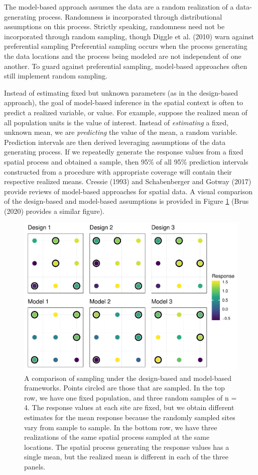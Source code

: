 \documentclass[]{elsarticle} %
\begin{document}
The model-based approach assumes the data are a random realization of a
data-generating process. Randomness is incorporated through
distributional assumptions on this process. Strictly speaking,
randomness need not be incorporated through random sampling, though
Diggle et al. (2010) warn against preferential sampling Preferential
sampling occurs when the process generating the data locations and the
process being modeled are not independent of one another. To guard
against preferential sampling, model-based approaches often still
implement random sampling.

Instead of estimating fixed but unknown parameters (as in the
design-based approach), the goal of model-based inference in the spatial
context is often to predict a realized variable, or value. For example,
suppose the realized mean of all population units is the value of
interest. Instead of \emph{estimating} a fixed, unknown mean, we are
\emph{predicting} the value of the mean, a random variable. Prediction
intervals are then derived leveraging assumptions of the data generating
process. If we repeatedly generate the response values from a fixed
spatial process and obtained a sample, then 95\% of all 95\% prediction
intervals constructed from a procedure with appropriate coverage will
contain their respective realized means. Cressie (1993) and
Schabenberger and Gotway (2017) provide reviews of model-based
approaches for spatial data. A visual comparison of the design-based and
model-based assumptions is provided in Figure \ref{fig:fig1} (Brus
(2020) provides a similar figure).

\begin{figure}
\includegraphics[width=1\linewidth]{manuscript_files/figure-latex/fig1-1} \caption{A comparison of sampling under the design-based and model-based frameworks. Points circled are those that are sampled. In the top row, we have one fixed population, and three random samples of n = 4. The response values at each site are fixed, but we obtain different estimates for the mean response because the randomly sampled sites vary from sample to sample. In the bottom row, we have three realizations of the same spatial process sampled at the same locations. The spatial process generating the response values has a single mean, but the realized mean is different in each of the three panels.}\label{fig:fig1}
\end{figure}
\end{document}

